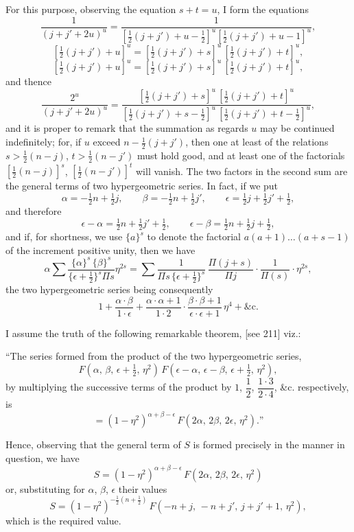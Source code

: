 \documentclass[12pt,a4paper]{article}
\theoremstyle{plain}
\begin{document}
\newpage
{} For this purpose, observing the equation $s+t=u$, I form the equations
\[
\dfrac{1}{(j+j'+2u)^{u}}=\dfrac{1}{[\tfrac{1}{2}(j+j')+u-\tfrac{1}{2}]^{u}[\tfrac{1}{2}(j+j')+u-1]^{u}},
\]
\[
[\tfrac{1}{2}(j+j')+u]^{u}=[\tfrac{1}{2}(j+j')+s]^{u}\,[\tfrac{1}{2}(j+j')+t]^{u},
\]
\[
[\tfrac{1}{2}(j+j')+u]^{u}=[\tfrac{1}{2}(j+j')+s]^{u}\,[\tfrac{1}{2}(j+j')+t]^{u},
\]
and thence
\[
\dfrac{2^{u}}{(j+j'+2u)^{u}}=\dfrac{[\tfrac{1}{2}(j+j')+s]^{u}\,[\tfrac{1}{2}(j+j')+t]^{u}}{[\tfrac{1}{2}(j+j')+s-\tfrac{1}{2}]^{u}\,[\tfrac{1}{2}(j+j')+t-\tfrac{1}{2}]^{u}},
\]
and it is proper to remark that the summation as regards $u$ may be continued indefinitely; for, if $u$ exceed $n-\tfrac{1}{2}(j+j')$, then one at least of the relations $s>\tfrac{1}{2}(n-j)$, $t>\tfrac{1}{2}(n-j')$ must hold good, and at least one of the factorials $[\tfrac{1}{2}(n-j)]^{s}$, $[\tfrac{1}{2}(n-j')]^{t}$ will vanish. The two factors in the second sum are the general terms of two hypergeometric series. In fact, if we put
\[
\alpha=-\tfrac{1}{2}n+\tfrac{1}{2}j,\qquad \beta=-\tfrac{1}{2}n+\tfrac{1}{2}j',\qquad \epsilon=\tfrac{1}{2}j+\tfrac{1}{2}j'+\tfrac{1}{2},
\]
and therefore
\[
\epsilon-\alpha=\tfrac{1}{2}n+\tfrac{1}{2}j'+\tfrac{1}{2},\qquad \epsilon-\beta=\tfrac{1}{2}n+\tfrac{1}{2}j+\tfrac{1}{2},
\]
and if, for shortness, we use $\{a\}^{s}$ to denote the factorial $a(a+1)\ldots(a+s-1)$ of the increment positive unity, then we have
\[
\alpha\sum\dfrac{\{\alpha\}^{s}\,\{\beta\}^{s}}{\{\epsilon+\tfrac{1}{2}\}^{s}\Pi s}\eta^{2s}=\sum\dfrac{1}{\Pi s\,\{\epsilon+\tfrac{1}{2}\}^{s}}\,\dfrac{\Pi(j+s)}{\Pi j}\cdot\dfrac{1}{\Pi(s)}\cdot\eta^{2s},
\]
the two hypergeometric series being consequently
\[
1+\dfrac{\alpha\cdot\beta}{1\cdot\epsilon}+\dfrac{\alpha\cdot\alpha+1}{1\cdot 2}\cdot\dfrac{\beta\cdot\beta+1}{\epsilon\cdot\epsilon+1}\,\eta^{4}+\&\mathrm{c.}
\]

\newpage
{} I assume the truth of the following remarkable theorem, [see 211] viz.:

\medskip
``The series formed from the product of the two hypergeometric series,
\[
F(\alpha,\,\beta,\,\epsilon+\tfrac{1}{2},\,\eta^{2})\,F(\epsilon-\alpha,\,\epsilon-\beta,\,\epsilon+\tfrac{1}{2},\,\eta^{2}),
\]
by multiplying the successive terms of the product by $1$, $\dfrac{1}{2}$, $\dfrac{1\cdot 3}{2\cdot 4}$, \&c. respectively, is
\[
=(1-\eta^{2})^{\alpha+\beta-\epsilon}\,F(2\alpha,\,2\beta,\,2\epsilon,\,\eta^{2}).\text{''}
\]

\medskip
Hence, observing that the general term of $S$ is formed precisely in the manner in question, we have
\[
S=(1-\eta^{2})^{\alpha+\beta-\epsilon}\,F(2\alpha,\,2\beta,\,2\epsilon,\,\eta^{2})
\]
or, substituting for $\alpha$, $\beta$, $\epsilon$ their values
\[
S=(1-\eta^{2})^{-\tfrac{1}{2}(n+\tfrac{1}{2})}\,F(-n+j,\,-n+j',\,j+j'+1,\,\eta^{2}),
\]
which is the required value.
\end{document}
